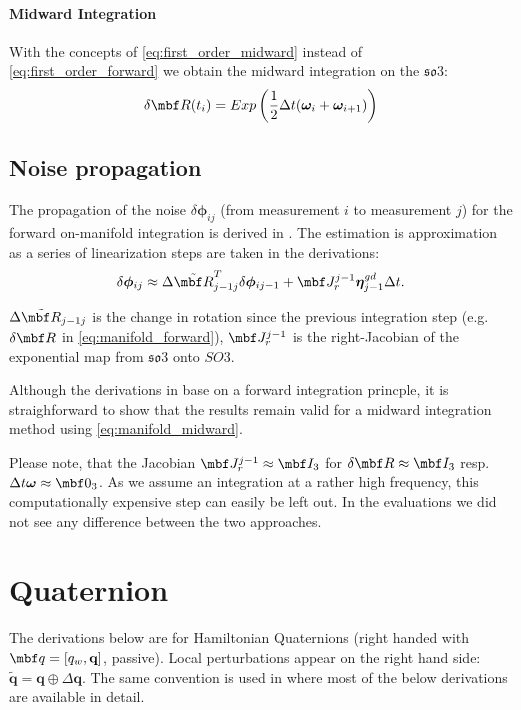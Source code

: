 \documentclass[10pt,a4paper]{article}
\newcommand{\mbs}[1]{{\boldsymbol{#1}}}
\numberwithin{equation}{section}
\begin{document}
\paragraph{Midward Integration}
With the concepts of \eqref{eq:first_order_midward} instead of \eqref{eq:first_order_forward} we obtain the midward integration on the $\mathfrak{so}3$:
\begin{equation}
\delta \mbf R(t_i) = Exp \left( \dfrac{1}{2}\Delta t (\mbs \omega_i + \mbs \omega_{i+1})\right)
\label{eq:manifold_midward}
\end{equation}

\subsection{Noise propagation}
The propagation of the noise $\delta \mbs \phi_{ij}$ (from measurement $i$ to measurement $j$) for the forward on-manifold integration is derived in \cite{forster}. The estimation is approximation as a series of linearization steps are taken in the derivations:
\begin{equation}
\delta \mbs \phi_{ij} \approx \Delta \tilde{\mbf R}_{j-1j}^T\delta \mbs \phi_{ij-1} + \mbf J_{r}^{j-1} \mbs \eta_{j-1}^{gd}\Delta t.
\label{eq:manifold_backward}
\end{equation}

$\Delta \tilde{\mbf R}_{j-1j}$ is the change in rotation since the previous integration step (e.g. $\delta \mbf R$ in \eqref{eq:manifold_forward}), $\mbf J_{r}^{j-1}$ is the right-Jacobian of the exponential map from $\mathfrak{so}3$ onto $SO3$.

Although the derivations in \cite{forster} base on a forward integration princple, it is straighforward to show that the results remain valid for a midward integration method using \eqref{eq:manifold_midward}.

Please note, that the Jacobian $\mbf J_{r}^{j-1} \approx \mbf I_3$ for $\delta \mbf R \approx \mbf I_3$ resp. $\Delta t \mbs \omega\approx \mbf 0_3$. As we assume an integration at a rather high frequency, this computationally expensive step can easily be left out. In the evaluations we did not see any difference between the two approaches.

\section{Quaternion}

The derivations below are for Hamiltonian Quaternions (right handed with $\mbf q = \left[ q_w , \textbf{q} \right]$, passive).
Local perturbations appear on the right hand side: $\tilde{\textbf{q}} = \textbf{q}\oplus \Delta \textbf{q}$.
The same convention is used in \cite{joan_sola} where most of the below derivations are available in detail.
\end{document}
